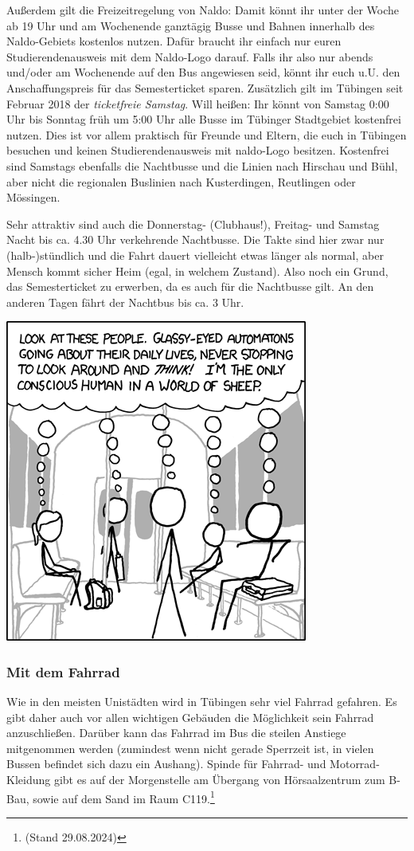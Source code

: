 Außerdem gilt die Freizeitregelung von Naldo: Damit könnt ihr unter der Woche ab 19 Uhr und am Wochenende ganztägig
Busse und Bahnen innerhalb des Naldo-Gebiets kostenlos nutzen. Dafür braucht ihr einfach nur euren Studierendenausweis
mit dem Naldo-Logo darauf. Falls ihr also nur abends und/oder am Wochenende auf den Bus angewiesen seid, könnt ihr
euch u.U. den Anschaffungspreis für das Semesterticket sparen.
Zusätzlich gilt im Tübingen seit Februar 2018 der \emph{ticketfreie Samstag}. Will heißen: Ihr könnt von Samstag
0:00 Uhr bis Sonntag früh um 5:00 Uhr alle Busse im Tübinger Stadtgebiet kostenfrei nutzen. Dies ist vor allem praktisch
für Freunde und Eltern, die euch in Tübingen besuchen und keinen Studierendenausweis mit naldo-Logo besitzen.
Kostenfrei sind Samstags ebenfalls die Nachtbusse und die Linien nach Hirschau und Bühl, aber nicht die regionalen
Buslinien nach Kusterdingen, Reutlingen oder Mössingen.

Sehr attraktiv sind auch die Donnerstag- (Clubhaus!), Freitag- und Samstag Nacht bis ca. 4.30 Uhr verkehrende Nachtbusse.  Die Takte sind hier zwar nur (halb-)stündlich und die Fahrt dauert vielleicht etwas länger als normal, aber Mensch kommt sicher Heim (egal, in welchem Zustand).  Also noch ein Grund, das Semesterticket zu erwerben, da es auch für die Nachtbusse gilt. An den anderen Tagen fährt der Nachtbus bis ca. 3 Uhr.

\begin{center}
\includegraphics[width=0.5\hsize]{shared/xkcd/sheeple.png}
\end{center}

\subsubsection*{Mit dem Fahrrad}
Wie in den meisten Unistädten wird in Tübingen sehr viel Fahrrad gefahren. Es gibt daher auch vor allen wichtigen Gebäuden die Möglichkeit sein Fahrrad anzuschließen. Darüber kann das Fahrrad im Bus die steilen Anstiege mitgenommen werden (zumindest wenn nicht gerade Sperrzeit ist, in vielen Bussen befindet sich dazu ein Aushang).
Spinde für Fahrrad- und Motorrad-Kleidung gibt es auf der Morgenstelle am Übergang von Hörsaalzentrum zum B-Bau, sowie auf dem Sand im Raum C119.\footnote{(Stand 29.08.2024)}

